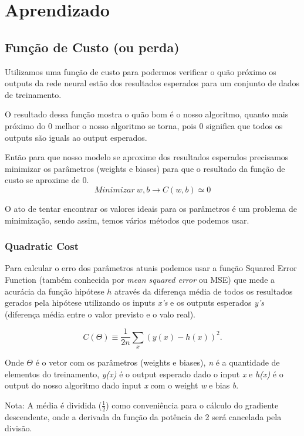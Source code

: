 \documentclass[11pt,a4paper,leqno]{article}
\begin{document}
\newpage
\section{Aprendizado}

\subsection{Função de Custo (ou perda)}
Utilizamos uma função de custo para podermos verificar o quão próximo os outputs da rede neural estão dos resultados esperados para um conjunto de dados de treinamento.

O resultado dessa função mostra o quão bom é o nosso algoritmo, quanto mais próximo do 0 melhor o nosso algoritmo se torna, pois 0 significa que todos os outputs são iguals ao output esperados.

Então para que nosso modelo se aproxime dos resultados esperados precisamos minimizar os parâmetros (weights e biases) para que o resultado da função de custo se aproxime de 0.
\[
Minimizar \ w, b \rightarrow C(w, b) \simeq 0
\]

O ato de tentar encontrar os valores ideais para os parâmetros é um problema de minimização, sendo assim, temos vários métodos que podemos usar.


\subsubsection{Quadratic Cost}

Para calcular o erro dos parâmetros atuais podemos usar a função Squared Error Function (também conhecida por \emph{mean squared error} ou MSE) que mede a acurácia da função hipótese $h$ através da diferença média de todos os resultados gerados pela hipótese utilizando os inputs \emph{x's} e os outputs esperados \emph{y's} (diferença média entre o valor previsto e o valo real).

\[
C(\Theta) \equiv \frac{1}{2n} \sum_x (y(x) - h(x))^2.
\]

Onde $\Theta$ é o vetor com os parâmetros (weights e biases), \emph{n} é a quantidade de elementos do treinamento, \emph{y(x)} é o output esperado dado o input \emph{x} e \emph{h(x)} é o output do nosso algoritmo dado input \emph{x} com o weight \emph{w} e bias \emph{b}.

Nota: A média é dividida ($\frac{1}{2}$) como conveniência para o cálculo do gradiente descendente, onde a derivada da função da potência de 2 será cancelada pela divisão.
\end{document}
